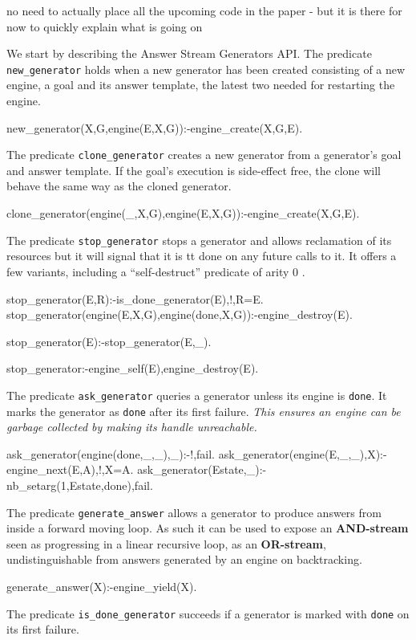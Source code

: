 \documentclass{new_tlp}
\begin{document}
{\Large no need to actually place all the upcoming code in the paper - but it is there for now to quickly explain what is going on}

We start by describing the Answer Stream Generators API.
The predicate {\tt new\_generator} holds when a new generator has been created
consisting of a new engine, a goal and its answer template, the latest two needed
for restarting the engine.
\begin{code}
new_generator(X,G,engine(E,X,G)):-engine_create(X,G,E).
\end{code}

The predicate  {\tt clone\_generator} creates a new generator from a generator's goal and answer template. If the goal's execution is side-effect free, the clone will behave the same way as the cloned generator.
\begin{code}
clone_generator(engine(_,X,G),engine(E,X,G)):-engine_create(X,G,E).
\end{code}

The predicate {\tt stop\_generator} stops a generator and allows reclamation of its resources but it will signal that it is {tt done} on any future calls to it.
It offers a few variants, including a ``self-destruct'' predicate of arity 0 .
\begin{code}
stop_generator(E,R):-is_done_generator(E),!,R=E.
stop_generator(engine(E,X,G),engine(done,X,G)):-engine_destroy(E).

stop_generator(E):-stop_generator(E,_).

stop_generator:-engine_self(E),engine_destroy(E).
\end{code}

The predicate {\tt ask\_generator} queries a generator unless its engine is {\tt done}.
It marks the generator as {\tt done} after its first failure.
{\em This ensures an engine can be garbage collected by making its handle unreachable.}
\begin{code}  
ask_generator(engine(done,_,_),_):-!,fail.
ask_generator(engine(E,_,_),X):-engine_next(E,A),!,X=A.
ask_generator(Estate,_):-nb_setarg(1,Estate,done),fail.  
\end{code}

The predicate {\tt generate\_answer} allows a generator to produce answers from inside a forward moving loop. As such it can be used to expose an {\bf AND-stream} seen as progressing  in a linear recursive loop, as an {\bf OR-stream}, undistinguishable from answers generated by an engine on backtracking.
\begin{code}
generate_answer(X):-engine_yield(X).
\end{code}
The predicate {\tt is\_done\_generator} succeeds if a generator is marked with {\tt done} on its first failure.
\end{document}
